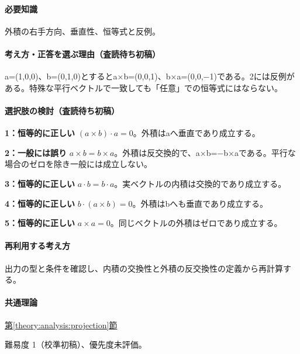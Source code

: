 \paragraph{必要知識} 外積の右手方向、垂直性、恒等式と反例。

\paragraph{考え方・正答を選ぶ理由（査読待ち初稿）} a=\allowbreak{}(1,0,0)、b=\allowbreak{}(0,1,0)とするとa×b=\allowbreak{}(0,0,1)、b×a=\allowbreak{}(0,0,−1)である。2には反例がある。特殊な平行ベクトルで一致しても「任意」での恒等式にはならない。

\paragraph{選択肢の検討（査読待ち初稿）}\mbox{}\par

\noindent\textbf{1：恒等的に正しい} \((a\times b)\cdot a=0\)。外積はaへ垂直であり成立する。\par

\noindent\textbf{2：一般には誤り} \(a\times b=b\times a\)。外積は反交換的で、a×b=−b×aである。平行な場合のゼロを除き一般には成立しない。\par

\noindent\textbf{3：恒等的に正しい} \(a\cdot b=b\cdot a\)。実ベクトルの内積は交換的であり成立する。\par

\noindent\textbf{4：恒等的に正しい} \(b\cdot(a\times b)=0\)。外積はbへも垂直であり成立する。\par

\noindent\textbf{5：恒等的に正しい} \(a\times a=0\)。同じベクトルの外積はゼロであり成立する。\par

\paragraph{再利用する考え方} 出力の型と条件を確認し、内積の交換性と外積の反交換性の定義から再計算する。

\paragraph{共通理論} \hyperref[theory:analysis:projection]{第\ref*{theory:analysis:projection}節}

\par 難易度 1（校準初稿）、優先度未評価。

